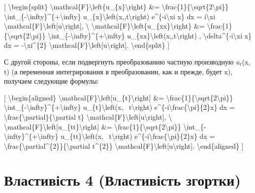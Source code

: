 \documentclass[
]{article}
\begin{document}
{[} \textbackslash begin\{split\}
\textbackslash mathcal\{F\}\textbackslash left\{u\_\{x\}\textbackslash right\}
\&=
\textbackslash frac\{1\}\{\textbackslash sqrt\{2\textbackslash pi\}\}
\textbackslash int\_\{-\textbackslash infty\}\^{}\{+\textbackslash infty\}
u\_\{x\}\textbackslash left(x,,t\textbackslash right)
e\^{}\{-i\textbackslash xi x\} dx = i\textbackslash xi
\textbackslash mathcal\{F\}\textbackslash left{[}u\textbackslash right{]},
\textbackslash{}
\textbackslash mathcal\{F\}\textbackslash left\{u\_\{xx\}\textbackslash right\}
\&=
\textbackslash frac\{1\}\{\textbackslash sqrt\{2\textbackslash pi\}\}
\textbackslash int\_\{-\textbackslash infty\}\^{}\{+\textbackslash infty\}
u\_\{xx\}\textbackslash left(x,,t\textbackslash right) ,
\textbackslash delta\^{}\{-i\textbackslash xi x\} dx =
-\textbackslash xi\^{}\{2\}
\textbackslash mathcal\{F\}\textbackslash left{[}u\textbackslash right{]}.
\textbackslash end\{split\} {]}

С другой стороны, если подвергнуть преобразованию частную производную
\(u_t\)(x, t) (а переменная интегрирования в преобразовании, как и
прежде, будет x), получаем следующие формулы:

{[} \textbackslash begin\{aligned\}
\textbackslash mathcal\{F\}\textbackslash left{[}u\_\{t\}\textbackslash right{]}
\&=
\textbackslash frac\{1\}\{\textbackslash sqrt\{2\textbackslash pi\}\}
\textbackslash int\_\{-\textbackslash infty\}\^{}\{+\textbackslash infty\}
u\_\{t\}\textbackslash left(x, ~t\textbackslash right)
e\^{}\{-i\textbackslash frac\{\textbackslash pi\}\{2\}x\} dx =
\textbackslash frac\{\textbackslash partial\}\{\textbackslash partial
t\}
\textbackslash mathcal\{F\}\textbackslash left{[}u\textbackslash right{]},
\textbackslash{}
\textbackslash mathcal\{F\}\textbackslash left{[}u\_\{tt\}\textbackslash right{]}
\&=
\textbackslash frac\{1\}\{\textbackslash sqrt\{2\textbackslash pi\}\}
\textbackslash int\_\{-\textbackslash infty\}\^{}\{+\textbackslash infty\}
u\_\{tt\}\textbackslash left(x, ~t\textbackslash right)
e\^{}\{-i\textbackslash frac\{\textbackslash pi\}\{2\}x\} dx =
\textbackslash frac\{\textbackslash partial\^{}\{2\}\}\{\textbackslash partial
t\^{}\{2\}\}
\textbackslash mathcal\{F\}\textbackslash left{[}u\textbackslash right{]}.
\textbackslash end\{aligned\} {]}

\section{Властивість 4 (Властивість
згортки)}\label{ux432ux43bux430ux441ux442ux438ux432ux456ux441ux442ux44c-4-ux432ux43bux430ux441ux442ux438ux432ux456ux441ux442ux44c-ux437ux433ux43eux440ux442ux43aux438}
\end{document}
